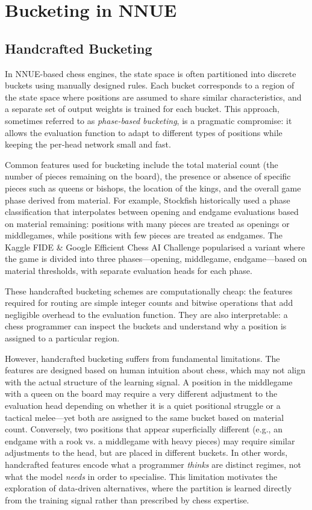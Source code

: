 \section{Bucketing in NNUE}


\subsection{Handcrafted Bucketing}

In NNUE-based chess engines, the state space is often partitioned into discrete buckets using manually designed rules. Each bucket corresponds to a region of the state space where positions are assumed to share similar characteristics, and a separate set of output weights is trained for each bucket. This approach, sometimes referred to as \emph{phase-based bucketing}, is a pragmatic compromise: it allows the evaluation function to adapt to different types of positions while keeping the per‑head network small and fast.

Common features used for bucketing include the total material count (the number of pieces remaining on the board), the presence or absence of specific pieces such as queens or bishops, the location of the kings, and the overall game phase derived from material. For example, Stockfish historically used a phase classification that interpolates between opening and endgame evaluations based on material remaining: positions with many pieces are treated as openings or middlegames, while positions with few pieces are treated as endgames. The Kaggle FIDE \& Google Efficient Chess AI Challenge popularised a variant where the game is divided into three phases---opening, middlegame, endgame---based on material thresholds, with separate evaluation heads for each phase.

These handcrafted bucketing schemes are computationally cheap: the features required for routing are simple integer counts and bitwise operations that add negligible overhead to the evaluation function. They are also interpretable: a chess programmer can inspect the buckets and understand why a position is assigned to a particular region.

However, handcrafted bucketing suffers from fundamental limitations. The features are designed based on human intuition about chess, which may not align with the actual structure of the learning signal. A position in the middlegame with a queen on the board may require a very different adjustment to the evaluation head depending on whether it is a quiet positional struggle or a tactical melee---yet both are assigned to the same bucket based on material count. Conversely, two positions that appear superficially different (e.g., an endgame with a rook vs. a middlegame with heavy pieces) may require similar adjustments to the head, but are placed in different buckets. In other words, handcrafted features encode what a programmer \emph{thinks} are distinct regimes, not what the model \emph{needs} in order to specialise. This limitation motivates the exploration of data-driven alternatives, where the partition is learned directly from the training signal rather than prescribed by chess expertise.


